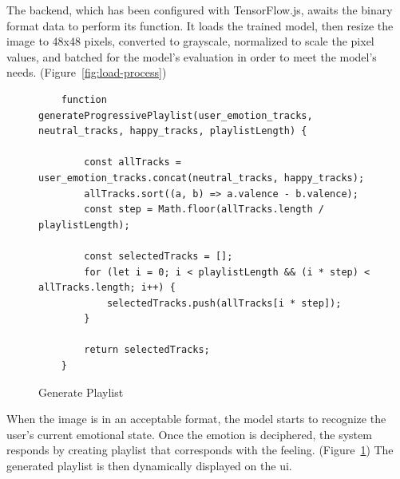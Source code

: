 The backend, which has been configured with TensorFlow.js, awaits the binary format data to perform its function.
It loads the trained model, then resize the image to 48x48 pixels, converted to grayscale, normalized to scale the pixel values, and batched for the model's evaluation in order to meet the model's needs. (Figure~\ref{fig:load-process})
\\
\begin{figure}[h!] 
    \centering
\begin{verbatim}
    function generateProgressivePlaylist(user_emotion_tracks, neutral_tracks, happy_tracks, playlistLength) {

        const allTracks = user_emotion_tracks.concat(neutral_tracks, happy_tracks);
        allTracks.sort((a, b) => a.valence - b.valence);
        const step = Math.floor(allTracks.length / playlistLength);

        const selectedTracks = [];
        for (let i = 0; i < playlistLength && (i * step) < allTracks.length; i++) {
            selectedTracks.push(allTracks[i * step]);
        }

        return selectedTracks;
    }
\end{verbatim}
    \caption{Generate Playlist}
    \label{fig:generate-playlist}
\end{figure}
\indent When the image is in an acceptable format, the model starts to recognize the user's current emotional state.
Once the emotion is deciphered, the system responds by creating playlist that corresponds with the feeling. (Figure~\ref{fig:generate-playlist})
The generated playlist is then dynamically displayed on the \gls{ui}.
